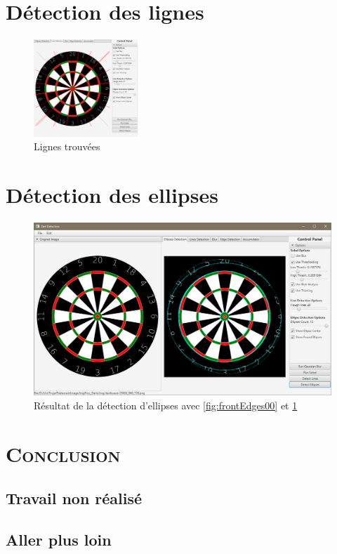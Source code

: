 \documentclass[a4paper, 11pt]{article}
\begin{document}
\section{Détection des lignes}
\paragraph{}
\begin{figure}
\vspace{-4mm}
\centering
\includegraphics[width=0.35\textwidth]{img/front_lines_00.png}
\vspace{-8mm}
\caption{Lignes trouvées}
\label{subfig:frontLines00}
\end{figure}

\section{Détection des ellipses}
\paragraph{}
\begin{figure}[!h]
\centering
\includegraphics[width=0.85\linewidth]{img/front_result_00.png}
\vspace{-3mm}
\caption{Résultat de la détection d'ellipses avec \ref{fig:frontEdges00} et \ref{subfig:frontLines00}}
\label{fig:frontResult00}
\end{figure}

\bigskip

\section*{\color{unilim_red}\textsc{Conclusion}}
\subsection*{Travail non réalisé}

\subsection*{Aller plus loin}

\clearpage
  

\nocite{*}


%
%



\end{document}
